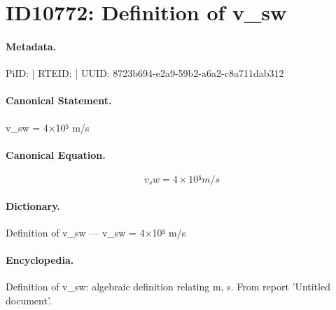 \section*{ID10772: Definition of v\_sw}
\paragraph{Metadata.}
PiID:  | RTEID:  | UUID: 8723b694-e2a9-59b2-a6a2-c8a711dab312

\paragraph{Canonical Statement.}
v\_sw = 4×10⁵ m/s

\paragraph{Canonical Equation.}
\[
v_sw = 4×10⁵ m/s
\]

\paragraph{Dictionary.}
Definition of v\_sw — v\_sw = 4×10⁵ m/s

\paragraph{Encyclopedia.}
Definition of v\_sw: algebraic definition relating m, s. From report 'Untitled document'.
